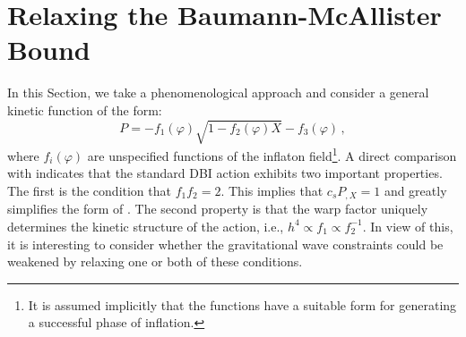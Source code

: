 \section{Relaxing the Baumann-McAllister Bound}
% 
\label{sec:relaxing-dbi}
% 
In this Section, we take a phenomenological 
approach and consider a general kinetic function of the form:
% 
\begin{equation}
\label{eq:genaction-dbi}
P= -f_1 (\varphi ) \sqrt{1-f_2 (\varphi ) X} -f_3 (\varphi) \,,
\end{equation}
% 
where $f_i (\varphi )$ are unspecified functions of the inflaton 
field\footnote{It is assumed 
implicitly that the functions have a suitable form for 
generating a successful phase of inflation.}.
A direct comparison with  
indicates that the standard DBI action exhibits two important properties. 
The first is the condition that $f_1 f_2 =2$. This implies that 
$c_sP_{,X} =1$ and greatly simplifies the form of . 
The second property is that the warp factor uniquely determines 
the kinetic structure of the action, i.e., $h^4 \propto f_1 \propto f_2^{-1}$.  
In view of this, it is interesting to consider whether
the gravitational wave constraints could be weakened by relaxing one 
or both of these conditions. 


